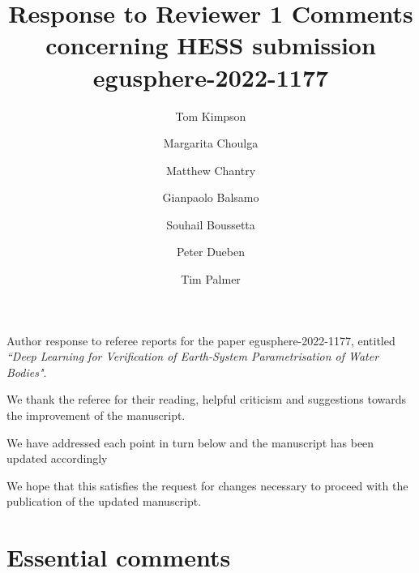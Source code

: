 \documentclass[10pt]{article}
\author{Tom Kimpson \\ 
	\and Margarita Choulga\\ 
 \and Matthew Chantry\\
\and Gianpaolo Balsamo\\  
 \and Souhail Boussetta\\
  \and Peter Dueben\\
   \and Tim Palmer\\
}
\title{\normalsize Response to Reviewer 1 Comments
  concerning HESS submission egusphere-2022-1177}
\begin{document}
	\maketitle
\noindent Author response to referee reports for the paper egusphere-2022-1177,
entitled \textit{``Deep Learning for Verification of Earth-System Parametrisation of Water Bodies"}. \newline 

\noindent We thank the referee for their reading, helpful criticism and suggestions towards the improvement of the manuscript. \newline 

\noindent We have addressed each point in turn below and the manuscript has been updated accordingly \newline 

\noindent  We hope that this satisfies the request for changes necessary to proceed with the publication of the updated manuscript. \newline 


\section*{Essential comments}
\end{document}
